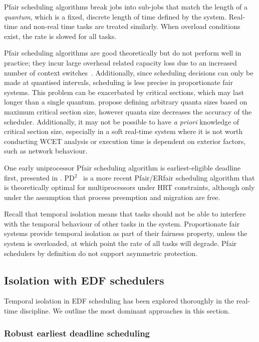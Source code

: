 Pfair scheduling algorithms break jobs into sub-jobs that match the length of a \emph{quantum},
which is a fixed, discrete length of time defined by the system.
Real-time and non-real time tasks are treated similarly.
When overload conditions exist, the rate is slowed for all tasks.

Pfair scheduling algorithms are good theoretically but do not perform well in practice; they incur
large overhead related capacity loss due to an increased number of context
switches~\citep{Abeni_Buttazzo_04}. Additionally, since
scheduling decisions can only be made at quantised intervals, scheduling is less precise in
proportionate fair systems.  This problem can be exacerbated by critical sections, which may last
longer than a single quantum.  \citet{Stoica_AKBGP_96} propose defining arbitrary quanta sizes based
on maximum critical section size, however quanta size decreases the accuracy of the scheduler.
Additionally, it may not be possible to have \emph{a priori} knowledge of critical section size, especially
in a soft real-time system where it is not worth conducting \gls{WCET} analysis or execution time
is dependent on exterior factors, such as network behaviour.

One early uniprocessor Pfair scheduling algorithm is earliest-eligible deadline first, presented in
\citet{Stoica_AKBGP_96}.  PD$^{2}$~\citep{Srinivasan_Anderson_06} is a more recent Pfair/ERfair
scheduling algorithm that is theoretically optimal for multiprocessors under \gls{HRT} constraints,
although only under the assumption that process preemption and migration are free.

Recall that temporal isolation means that tasks should not be able to interfere with the temporal
behaviour of other tasks in the system.  Proportionate fair systems provide temporal isolation as
part of their fairness property, unless the system is overloaded, at which point the rate of all
tasks will degrade. Pfair schedulers by definition do not support asymmetric protection.

\subsection{Isolation with EDF schedulers}

Temporal isolation in \gls{EDF} scheduling has been explored thoroughly in the real-time discipline.
We outline the most dominant approaches in this section.

\subsubsection{Robust earliest deadline scheduling}

